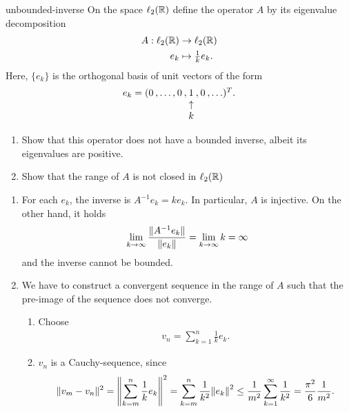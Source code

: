 \begin{Problem}{unbounded-inverse}
  On the space $\ell_2(\mathbb R)$ define the operator $A$ by its eigenvalue
  decomposition
  \begin{align*}
    A: \ell_2(\mathbb R) &\to \ell_2(\mathbb R)\\
    e_k & \mapsto \tfrac1k e_k.
  \end{align*}
  Here, $\{e_k\}$ is the orthogonal basis of unit vectors of the form
  \begin{gather*}
    \arraycolsep0.1em
    \begin{array}{cccccccc}
      e_k =(0&,\ldots,&0&,&1&,&0&,\ldots)^T.\\
      &&&&\uparrow\\
      &&&&k
    \end{array}
  \end{gather*}
  \begin{enumerate}
  \item Show that this operator does not have a bounded inverse, albeit
    its eigenvalues are positive.
  \item Show that the range of $A$ is not closed in $\ell_2(\mathbb R)$
  \end{enumerate}
\begin{solution}  
  \begin{enumerate}
  \item For each $e_k$, the inverse is $A^{-1} e_k = k e_k$. In particular, $A$ is injective.
    On the other hand, it holds
    \begin{gather*}
      \lim_{k\to\infty}\frac{\lVert A^{-1}e_k\rVert}{\lVert e_k\rVert}=\lim_{k\to\infty}k=\infty
    \end{gather*}
      and the inverse cannot be bounded.
  \item We have to construct a convergent sequence in the range of $A$
    such that the pre-image of the sequence does not converge.
    \begin{enumerate}
    \item Choose
      \begin{gather*}
        v_n = \sum_{k=1}^n \frac1k e_k.
      \end{gather*}
      \item $v_n$ is a Cauchy-sequence, since
        \begin{gather*}
          \norm{v_m-v_n}^2 = \norm*{\sum_{k=m}^n \frac1k e_k}^2
          = \sum_{k=m}^n \frac1{k^2}\norm*{e_k}^2
          \le \frac1{m^2} \sum_{k=1}^\infty \frac1{k^2}
          = \frac{\pi^2}{6} \frac1{m^2}.
        \end{gather*}

\end{enumerate}
\end{enumerate}
\end{solution}
\end{Problem}
